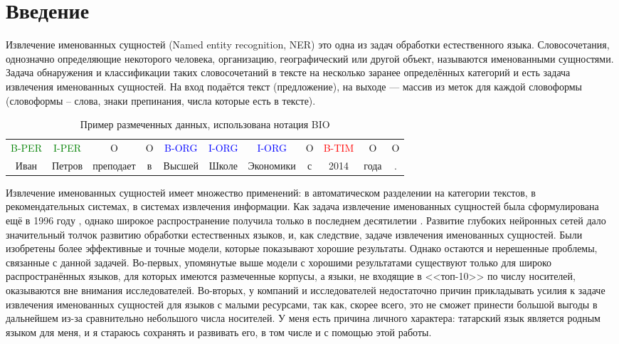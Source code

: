 \section{Введение}

Извлечение именованных сущностей (Named entity recognition, NER) это одна из задач обработки естественного языка. Словосочетания, однозначно определяющие некоторого человека, организацию, географический или другой объект, называются именованными сущностями. Задача обнаружения и классификации таких словосочетаний в тексте на несколько заранее определённых категорий и есть задача извлечения именованных сущностей. На вход подаётся текст (предложение), на выходе --- массив из меток для каждой словоформы (словоформы -- слова, знаки препинания, числа которые есть в тексте).

\begin{table}[h]
\begin{tabular}[h]{ccccccccccc}
\textcolor{green}{B-PER} & \textcolor{green}{I-PER} & O & O & \textcolor{blue}{B-ORG} &  \textcolor{blue}{I-ORG} &  \textcolor{blue}{I-ORG} & O & \textcolor{red}{B-TIM} & O & O \\
Иван & Петров & преподает & в & Высшей & Школе & Экономики & с & 2014 & года & . \\
\end{tabular}
\caption{Пример размеченных данных, использована нотация BIO}
\end{table}

Извлечение именованных сущностей имеет множество применений: в автоматическом разделении на категории текстов, в рекомендательных системах, в системах извлечения информации. Как задача извлечение именованных сущностей была сформулирована ещё в 1996 году \cite{first_NER}, однако широкое распространение получила только в последнем десятилетии \cite{DBLP:journals/corr/abs-1812-09449}. Развитие глубоких нейронных сетей дало значительный толчок развитию обработки естественных языков, и, как следствие, задаче извлечения именованных сущностей. Были изобретены более эффективные и точные модели, которые показывают хорошие результаты. Однако остаются и нерешенные проблемы, связанные с данной задачей. Во-первых, упомянутые выше модели с хорошими результатами существуют только для широко распространённых языков, для которых имеются размеченные корпусы, а языки, не входящие в <<топ-10>> по числу носителей, оказываются вне внимания исследователей. Во-вторых, у компаний и исследователей недостаточно причин прикладывать усилия к задаче извлечения именованных сущностей для языков с малыми ресурсами, так как, скорее всего, это не сможет принести большой выгоды в дальнейшем из-за сравнительно небольшого числа носителей. У меня есть причина личного характера: татарский язык является родным языком для меня, и я стараюсь сохранять и развивать его, в том числе и с помощью этой работы.

